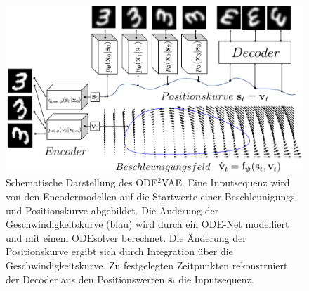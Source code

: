\documentclass[12pt]{article}
\begin{document}
	\begin{figure}[h!]
		\centering
		\includegraphics[scale=0.57]{ODE2VAE_ODE_Net}
		\captionsetup{labelformat=empty}
		\caption{Schematische Darstellung des ODE$^2$VAE. Eine Inputsequenz wird von den Encodermodellen auf die Startwerte einer Beschleunigungs- und Positionskurve abgebildet. Die Änderung der Geschwindigkeitskurve (blau) wird durch ein ODE-Net modelliert und mit einem ODEsolver berechnet. Die Änderung der Positionskurve ergibt sich durch Integrati\nolinebreak on über die Geschwindigkeitskurve. Zu festgelegten Zeitpunkten rekonstruiert der Decoder aus den Positionswerten $\mathbf{s}_t$ die Inputsequenz.}
	\end{figure}
\end{document}
